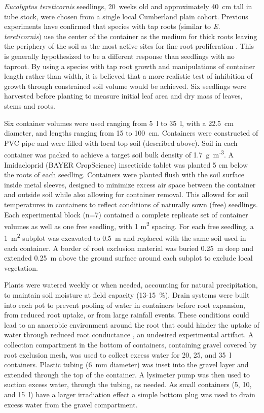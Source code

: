 \documentclass[a4paper]{article}\usepackage[]{graphicx}\usepackage[]{color}
\begin{document}
\textit{Eucalyptus tereticornis} seedlings, 20~weeks old and approximately 40~cm tall in tube stock, were chosen from a single local Cumberland plain cohort. Previous experiments have confirmed that species with tap roots (similar to \textit{E. tereticornis}) use the center of the container as the medium for thick roots leaving the periphery of the soil as the most active sites for fine root proliferation \citep{biran1980a,biran1980b}. This is generally hypothesized to be a different response than seedlings with no taproot. By using a species with tap root growth and manipulations of container length rather than width, it is believed that a more realistic test of inhibition of growth through constrained soil volume would be achieved. Six seedlings were harvested before planting to measure initial leaf area and dry mass of leaves, stems and roots.

Six container volumes were used ranging from 5~l to 35~l, with a 22.5~cm diameter, and lengths ranging from 15 to 100~cm. Containers were constructed of PVC pipe and were filled with local top soil (described above). Soil in each container was packed to achieve a target soil bulk density of 1.7~g~m\textsuperscript{-3}. A Imidacloprid (BAYER CropScience) insecticide tablet was planted 5 cm below the roots of each seedling. Containers were planted flush with the soil surface inside metal sleeves, designed to minimize excess air space between the container and outside soil while also allowing for container removal. This allowed for soil temperatures in containers to reflect conditions of naturally sown (free) seedlings. Each experimental block (n=7) contained a complete replicate set of container volumes as well as one free seedling, with 1 m\textsuperscript{2} spacing. For each free seedling, a 1~m\textsuperscript{2} subplot was excavated to 0.5~m and replaced with the same soil used in each container. A border of root exclusion material was buried 0.25~m deep and extended 0.25~m above the ground surface around each subplot to exclude local vegetation.

Plants were watered weekly or when needed, accounting for natural precipitation, to maintain soil moisture at field capacity (13-15~\%). Drain systems were built into each pot to prevent pooling of water in containers before root expansion, from reduced root uptake, or from large rainfall events. These conditions could lead to an anaerobic environment around the root that could hinder the uptake of water through reduced root conductance \citep{poorter2009causes}, an undesired experimental artifact. A collection compartment in the bottom of containers, containing gravel covered by root exclusion mesh, was used to collect excess water for 20, 25, and 35~l containers. Plastic tubing (6~mm diameter) was inset into the gravel layer and extended through the top of the container. A lysimeter pump was then used to suction excess water, through the tubing, as needed. As small containers (5, 10, and 15~l) have a larger irradiation effect a simple bottom plug was used to drain excess water from the gravel compartment.  
\end{document}
